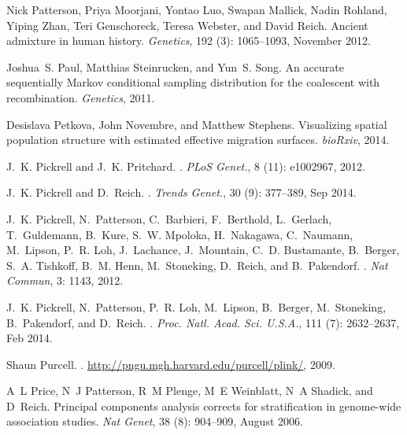 \documentclass[10pt,letterpaper]{article}
\begin{document}
\begin{thebibliography}{80}
Nick Patterson, Priya Moorjani, Yontao Luo, Swapan Mallick, Nadin Rohland,
  Yiping Zhan, Teri Genschoreck, Teresa Webster, and David Reich.
\newblock Ancient admixture in human history.
\newblock \emph{Genetics}, 192 (3): 1065--1093, November
  2012.

Joshua~S. Paul, Matthias Steinrucken, and Yun~S. Song.
\newblock An accurate sequentially {Markov} conditional sampling distribution
  for the coalescent with recombination.
\newblock \emph{Genetics}, 2011.

Desislava Petkova, John Novembre, and Matthew Stephens.
\newblock Visualizing spatial population structure with estimated effective
  migration surfaces.
\newblock \emph{bioRxiv}, 2014.

J.~K. Pickrell and J.~K. Pritchard.
.
\newblock \emph{PLoS Genet.}, 8 (11): e1002967, 2012.

J.~K. Pickrell and D.~Reich.
.
\newblock \emph{Trends Genet.}, 30 (9): 377--389, Sep 2014.

J.~K. Pickrell, N.~Patterson, C.~Barbieri, F.~Berthold, L.~Gerlach,
  T.~Guldemann, B.~Kure, S.~W. Mpoloka, H.~Nakagawa, C.~Naumann, M.~Lipson,
  P.~R. Loh, J.~Lachance, J.~Mountain, C.~D. Bustamante, B.~Berger, S.~A.
  Tishkoff, B.~M. Henn, M.~Stoneking, D.~Reich, and B.~Pakendorf.
.
\newblock \emph{Nat Commun}, 3: 1143, 2012.

J.~K. Pickrell, N.~Patterson, P.~R. Loh, M.~Lipson, B.~Berger, M.~Stoneking,
  B.~Pakendorf, and D.~Reich.
.
\newblock \emph{Proc. Natl. Acad. Sci. U.S.A.}, 111 (7):
  2632--2637, Feb 2014.

Shaun Purcell.
.
\newblock \url{http://pngu.mgh.harvard.edu/purcell/plink/}, 2009.

A~L Price, N~J Patterson, R~M Plenge, M~E Weinblatt, N~A Shadick, and D~Reich.
\newblock Principal components analysis corrects for stratification in
  genome-wide association studies.
\newblock \emph{Nat Genet}, 38 (8): 904--909, August 2006.


\end{thebibliography}
\end{document}
